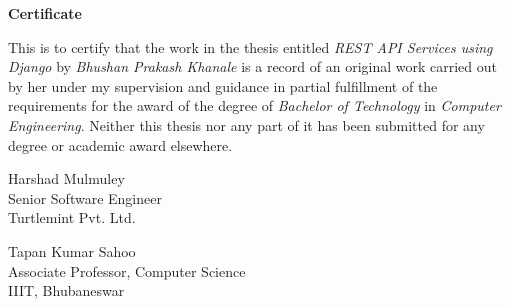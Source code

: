 \centerline{\Large{\bf Certificate}}
\vspace{1cm}

\noindent This is to certify that the work in the thesis entitled
{\it REST API Services using Django } by {\it Bhushan Prakash Khanale}
is a record of an original work carried out by her under my
supervision and guidance in partial fulfillment of the requirements for
the award of the degree of \textit{Bachelor of Technology} in
\textit{Computer Engineering}. Neither this thesis nor any part of
it has been submitted for any degree or academic award elsewhere.

\vspace*{0.5in}
\begin{flushright}
Harshad Mulmuley\\
Senior Software Engineer\\
Turtlemint Pvt. Ltd.
\end{flushright}
\vspace*{0.5in}
\begin{flushright} 
Tapan Kumar Sahoo\\
Associate Professor, Computer Science\\
IIIT, Bhubaneswar
\end{flushright}
